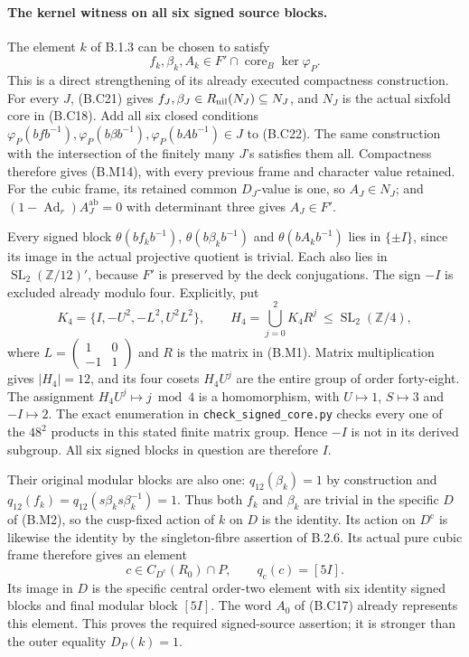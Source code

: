 \paragraph{The kernel witness on all six signed source blocks.}
The element $k$ of B.1.3 can be chosen to satisfy
\[
 f_k,\beta_k,A_k\in F'\cap\operatorname{core}_B\ker\varphi_P.
                                                        \tag{B.M14}
\]
This is a direct strengthening of its already executed
compactness construction.  For every $J$, (B.C21) gives
$f_J,\beta_J\in R_{\rm nil}(N_J)\subseteq N_J$, and
$N_J$ is the actual sixfold core in (B.C18).  Add all six
closed conditions
$\varphi_P(bfb^{-1}),\varphi_P(b\beta b^{-1}),
\varphi_P(bAb^{-1})\in J$
to (B.C22).  The same construction with the intersection
of the finitely many $J$'s satisfies them all.  Compactness
therefore gives (B.M14), with every previous frame and
character value retained.  For the cubic frame, its
retained common $D_J$-value is one, so $A_J\in N_J$;
and $(1-\operatorname{Ad}_r)A_J^{\mathrm{ab}}=0$ with
determinant three gives $A_J\in F'$.

Every signed block $\theta(bf_kb^{-1})$,
$\theta(b\beta_kb^{-1})$ and $\theta(bA_kb^{-1})$
lies in $\{\pm I\}$, since
its image in the actual projective quotient is trivial.
Each also lies in $\operatorname{SL}_2(\mathbb Z/12)'$,
because $F'$ is preserved by the deck conjugations.
The sign $-I$ is excluded already modulo four.  Explicitly,
put
\[
 K_4=\{I,-U^2,-L^2,U^2L^2\},\qquad
 H_4=\bigcup_{j=0}^2 K_4R^j
       \ \leq\operatorname{SL}_2(\mathbb Z/4),
                                                        \tag{B.M15}
\]
where $L=\left(\begin{smallmatrix}1&0\\-1&1\end{smallmatrix}\right)$
and $R$ is the matrix in (B.M1).  Matrix multiplication
gives $|H_4|=12$, and its four cosets $H_4U^j$ are
the entire group of order forty-eight.  The assignment
$H_4U^j\mapsto j\bmod4$ is a homomorphism, with
$U\mapsto1$, $S\mapsto3$ and $-I\mapsto2$.
The exact enumeration in \texttt{check\_signed\_core.py}
checks every one of the $48^2$ products in this stated
finite matrix group.  Hence $-I$ is not in its derived
subgroup.  All six signed blocks in question are
therefore $I$.

Their original modular blocks are also one:
$q_{12}(\beta_k)=1$ by construction and
$q_{12}(f_k)=q_{12}(s\beta_ks\beta_k^{-1})=1$.
Thus both $f_k$ and $\beta_k$ are trivial in the
specific $D$ of (B.M2), so the cusp-fixed action of
$k$ on $D$ is the identity.  Its action on $D^{\mathrm c}$
is likewise the identity by the singleton-fibre
assertion of B.2.6.  Its actual pure cubic frame
therefore gives an element
\[
 c\in C_{D^{\mathrm c}}(R_0)\cap P,
             \qquad q_{\mathrm c}(c)=[5I].      \tag{B.M16}
\]
Its image in $D$ is the specific central order-two
element with six identity signed blocks and final
modular block $[5I]$.  The word $A_0$ of (B.C17)
already represents this element.
This proves the required signed-source assertion;
it is stronger than the outer equality $D_P(k)=1$.

